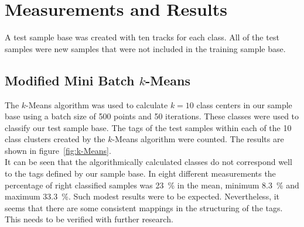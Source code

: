 \section{Measurements and Results}
\label{sec:Measurements}
A test sample base was created with ten tracks for each class. All of the test samples were new samples that were not included in the training sample base.

\subsection{Modified Mini Batch $k$-Means}
The $k$-Means algorithm was used to calculate $k=10$ class centers in our sample base using a batch size of 500 points and 50 iterations. These classes were used to classify our test sample base. The tags of the test samples within each of the 10 class clusters created by the $k$-Means algorithm were counted. The results are shown in figure~\ref{fig:k-Means}.\\
It can be seen that the algorithmically calculated classes do not correspond well to the tags defined by our sample base. In eight different measurements the percentage of right classified samples was 23~\% in the mean, minimum 8.3~\% and maximum 33.3~\%. Such modest results were to be expected. Nevertheless, it seems that there are some consistent mappings in the structuring of the tags. This needs to be verified with further research. %
